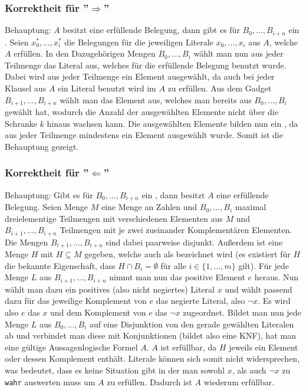 \documentclass[a4paper]{article}
\begin{document}
			\subsubsection{Korrektheit für ''$\Rightarrow$''}
			Behauptung: $A$ besitzt eine erfüllende Belegung, dann gibt es für $B_0,\dots,B_{i+n}$ ein \hitset.\n
			Seien $x_0^*, \dots, x_i^*$ die Belegungen für die jeweiligen Literale $x_0, \dots, x_i$ aus $A$, welche $A$ erfüllen. In den Dazugehörigen Mengen $B_0, \dots, B_i$ wählt man nun aus jeder Teilmenge das Literal aus, welches für die erfüllende Belegung benutzt wurde. Dabei wird aus jeder Teilmenge ein Element ausgewählt, da auch bei jeder Klausel aus $A$ ein Literal benutzt wird im $A$ zu erfüllen.\n
			Aus dem Gadget $B_{i+1}, \dots, B_{i+n}$ wählt man das Element aus, welches man bereits aus $B_0, \dots, B_i$ gewählt hat, wodurch die Anzahl der ausgewählten Elemente nicht über die Schranke $k$ hinaus wachsen kann.\n
			Die ausgewählten Elemente bilden nun ein \hitset, da aus jeder Teilmenge mindestens ein Element ausgewählt wurde. Somit ist die Behauptung gezeigt.
			\subsubsection{Korrektheit für ''$\Leftarrow$''}
			Behauptung: Gibt es für $B_0,\dots,B_{i+n}$ ein \hitset, dann besitzt $A$ eine erfüllende Belegung.\n
			Seien Menge $M$ eine Menge an Zahlen und $B_0, \dots, B_i$ maximal dreielementige Teilmengen mit verschiedenen Elementen aus $M$ und $B_{i+1}, \dots, B_{i+n}$ Teilmengen mit je zwei zueinander Komplementären Elementen. Die Mengen $B_{i+1}, \dots, B_{i+n}$ sind dabei paarweise disjunkt. Außerdem ist eine Menge $H$ mit $H\subseteq M$ gegeben, welche auch als \hitset bezeichnet wird (es existiert für $H$ die bekannte Eigenschaft, dass $H\cap B_i=\emptyset$ für alle $i\in\{1, \dots, m\}$ gilt).\n
			Für jede Menge $L$ aus $B_{i+1}, \dots, B_{i+n}$ nimmt man nun das positive Element $e$ heraus. Nun wählt man dazu ein positives (also nicht negiertes) Literal $x$ und wählt passend dazu für das jeweilige Komplement von $e$ das negierte Literal, also $\neg x$. Es wird also $e$ das $x$ und dem Komplement von $e$ das $\neg x$ zugeordnet.\n
			Bildet man nun jede Menge $L$ aus $B_{0}, \dots, B_{i}$ auf eine Disjunktion von den gerade gewählten Literalen ab und verbindet man diese mit Konjunktionen (bildet also eine KNF), hat man eine gültige Aussagenlogische Formel $A$.\n
			$A$ ist erfüllbar, da $H$ jeweils ein Element oder dessen Komplement enthält. Literale können sich somit nicht widersprechen, was bedeutet, dass es keine Situation gibt in der man sowohl $x$, als auch $\neg x$ zu \texttt{wahr} auswerten muss um $A$ zu erfüllen. Dadurch ist $A$ wiederum erfüllbar.
\end{document}
